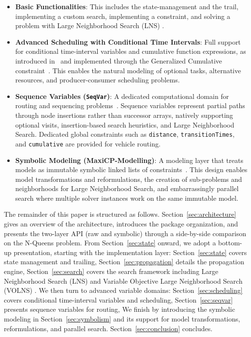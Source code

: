 \documentclass[11pt, a4paper]{scrartcl}
\newcommand{\maxicp}{\textsf{MaxiCP}}
\begin{document}
\begin{itemize}[leftmargin=*]

    \item \textbf{Basic Functionalities}:
    This includes the state-management and the trail, implementing a custom search, implementing a constraint, and solving a problem with Large Neighborhood Search (LNS) \cite{shaw1998using}.

    \item \textbf{Advanced Scheduling with Conditional Time Intervals}:
    Full support for conditional time-interval variables and cumulative function expressions, as introduced in~\cite{LaborieRSV09} and implemented through the Generalized Cumulative constraint~\cite{Schaus2025GeneralizedCumulative}. This enables the natural modeling of optional tasks, alternative resources, and producer-consumer scheduling problems.

    \item \textbf{Sequence Variables (\texttt{SeqVar})}:
    A dedicated computational domain for routing and sequencing problems~\cite{Schaus2022SeqVar}. Sequence variables represent partial paths through node insertions rather than successor arrays, natively supporting optional visits, insertion-based search heuristics, and Large Neighborhood Search. Dedicated global constraints such as \texttt{distance}, \texttt{transitionTimes}, and \texttt{cumulative} are provided for vehicle routing.


    \item \textbf{Symbolic Modeling (\maxicp-Modelling)}:
    A modeling layer that treats models as immutable symbolic linked lists of constraints~\cite{Derval2023Symbolism}. 
    This design enables model transformations and reformulations, the creation of sub-problems and neighborhoods for Large Neighborhood Search, 
    and embarrassingly parallel search where multiple solver instances work on the same immutable model.

\end{itemize}

The remainder of this paper is structured as follows.
Section~\ref{sec:architecture} gives an overview of the architecture, introduces the package organization, and presents the two-layer API (raw and symbolic) through a side-by-side comparison on the N-Queens problem.
From Section~\ref{sec:state} onward, we adopt a bottom-up presentation, starting with the implementation layer:
Section~\ref{sec:state} covers state management and trailing,
Section~\ref{sec:propagation} details the propagation engine,
Section~\ref{sec:search} covers the search framework including Large Neighborhood Search (LNS) \cite{shaw1998using} and Variable Objective Large Neighborhood Search (VOLNS) \cite{volns}.
We then turn to advanced variable domains:
Section~\ref{sec:scheduling} covers conditional time-interval variables and scheduling,
Section~\ref{sec:seqvar} presents sequence variables for routing,
We finish by introducing the symbolic modeling in Section~\ref{sec:symbolism} and its support for model transformations, reformulations, and parallel search.
Section~\ref{sec:conclusion} concludes.
\end{document}

